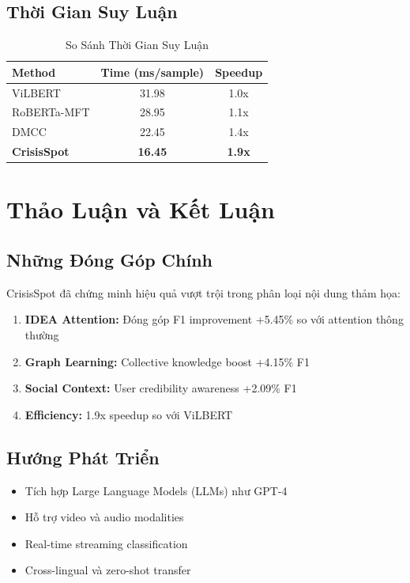 \documentclass[12pt,a4paper]{article}
\begin{document}
\subsection{Thời Gian Suy Luận}

\begin{table}[H]
\centering
\caption{So Sánh Thời Gian Suy Luận}
\label{tab:inference}
\begin{tabular}{l|c|c}
\toprule
\textbf{Method} & \textbf{Time (ms/sample)} & \textbf{Speedup} \\
\midrule
ViLBERT & 31.98 & 1.0x \\
RoBERTa-MFT & 28.95 & 1.1x \\
DMCC & 22.45 & 1.4x \\
\textbf{CrisisSpot} & \textbf{16.45} & \textbf{1.9x} \\
\bottomrule
\end{tabular}
\end{table}

\section{Thảo Luận và Kết Luận}

\subsection{Những Đóng Góp Chính}

CrisisSpot đã chứng minh hiệu quả vượt trội trong phân loại nội dung thảm họa:

\begin{enumerate}
    \item \textbf{IDEA Attention:} Đóng góp F1 improvement +5.45\% so với attention thông thường
    \item \textbf{Graph Learning:} Collective knowledge boost +4.15\% F1
    \item \textbf{Social Context:} User credibility awareness +2.09\% F1
    \item \textbf{Efficiency:} 1.9x speedup so với ViLBERT
\end{enumerate}

\subsection{Hướng Phát Triển}

\begin{itemize}
    \item Tích hợp Large Language Models (LLMs) như GPT-4
    \item Hỗ trợ video và audio modalities
    \item Real-time streaming classification
    \item Cross-lingual và zero-shot transfer
\end{itemize}
\end{document}

